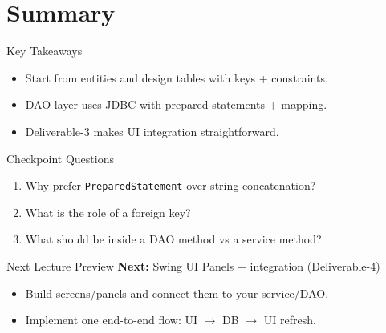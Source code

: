 \documentclass{beamer}
\begin{document}
\section{Summary}
\label{sec:summary}

\begin{frame}{Key Takeaways}
  \begin{itemize}[<+->]
    \item Start from entities and design tables with keys + constraints.
    \item DAO layer uses JDBC with prepared statements + mapping.
    \item Deliverable-3 makes UI integration straightforward.
  \end{itemize}
  \slidesources{\OOPSUnitVISources}
\end{frame}

\begin{frame}{Checkpoint Questions}
  \begin{enumerate}[<+->]
    \item Why prefer \texttt{PreparedStatement} over string concatenation?
    \item What is the role of a foreign key?
    \item What should be inside a DAO method vs a service method?
  \end{enumerate}
  \slidesources{\OOPSUnitVISources}
\end{frame}

\begin{frame}{Next Lecture Preview}
  \textbf{Next:} Swing UI Panels + integration (Deliverable-4)
  \vspace{0.6em}
  \begin{itemize}[<+->]
    \item Build screens/panels and connect them to your service/DAO.
    \item Implement one end-to-end flow: UI $\rightarrow$ DB $\rightarrow$ UI refresh.
  \end{itemize}
  \slidesources{\OOPSUnitVISources}
\end{frame}
\end{document}
